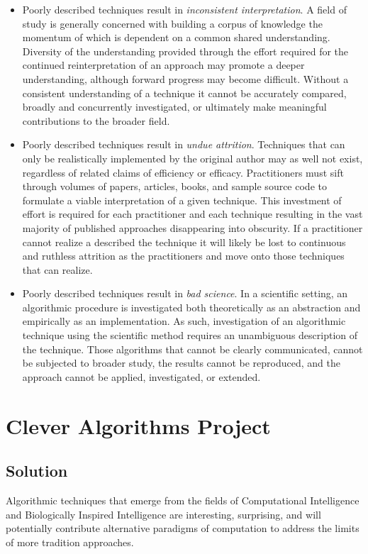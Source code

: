 \documentclass[a4paper, 11pt]{article}
\begin{document}
\begin{itemize}
	\item Poorly described techniques result in \emph{inconsistent interpretation}. A field of study is generally concerned with building a corpus of knowledge the momentum of which is dependent on a common shared understanding. Diversity of the understanding provided through the effort required for the continued reinterpretation of an approach may promote a deeper understanding, although forward progress may become difficult. Without a consistent understanding of a technique it cannot be accurately compared, broadly and concurrently investigated, or ultimately make meaningful contributions to the broader field. 
	\item Poorly described techniques result in \emph{undue attrition}. Techniques that can only be realistically implemented by the original author may as well not exist, regardless of related claims of efficiency or efficacy. Practitioners must sift through volumes of papers, articles, books, and sample source code to formulate a viable interpretation of a given technique. This investment of effort is required for each practitioner and each technique resulting in the vast majority of published approaches disappearing into obscurity. If a practitioner cannot realize a described the technique it will likely be lost to continuous and ruthless attrition as the practitioners and move onto those techniques that can realize.
	\item Poorly described techniques result in \emph{bad science}. In a scientific setting, an algorithmic procedure is investigated both theoretically as an abstraction and empirically as an implementation. As such, investigation of an algorithmic technique using the scientific method requires an unambiguous description of the technique. Those algorithms that cannot be clearly communicated, cannot be subjected to broader study, the results cannot be reproduced, and the approach cannot be applied, investigated, or extended. 
\end{itemize}

\section{Clever Algorithms Project}

\subsection{Solution}
Algorithmic techniques that emerge from the fields of Computational Intelligence and Biologically Inspired Intelligence are interesting, surprising, and will potentially contribute alternative paradigms of computation to address the limits of more tradition approaches. 
\end{document}
